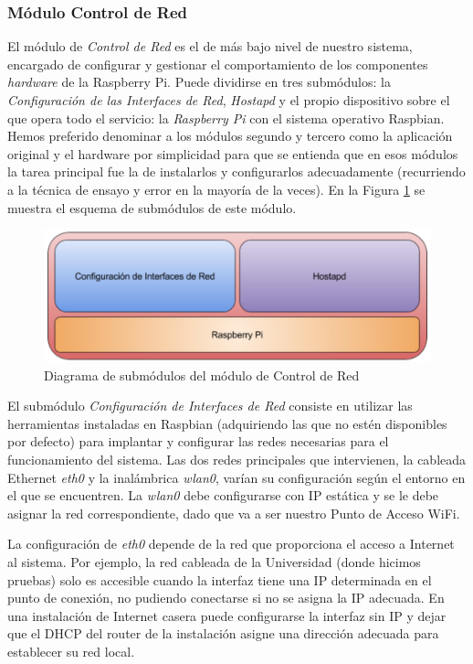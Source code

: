 \subsubsection{Módulo Control de Red}
El módulo de \emph{Control de Red} es el de más bajo nivel de nuestro sistema, encargado de configurar y gestionar el comportamiento de los componentes \emph{hardware} de la Raspberry Pi. Puede dividirse en tres submódulos: la \emph{Configuración de las Interfaces de Red}, \emph{Hostapd} y el propio dispositivo sobre el que opera todo el servicio: la \emph{Raspberry Pi} con el sistema operativo Raspbian. Hemos preferido denominar a los módulos segundo y tercero como la aplicación original y el hardware por simplicidad para que se entienda que en esos módulos la tarea principal fue la de instalarlos y configurarlos adecuadamente (recurriendo a la técnica de ensayo y error en la mayoría de la veces). En la Figura \ref{moduloControlRed} se muestra el esquema de submódulos de este módulo. 

\begin{figure}[!t]
\begin{center}
\includegraphics[width=0.75\linewidth]{./4_AnalisisFuncional/Img/moduloControlRed.png}
\end{center}
\caption{Diagrama de submódulos del módulo de Control de Red}
\label{moduloControlRed}
\end{figure}

El submódulo \emph{Configuración de Interfaces de Red} consiste en utilizar las herramientas instaladas en Raspbian (adquiriendo las que no estén disponibles por defecto) para implantar y configurar las redes necesarias para el funcionamiento del sistema. Las dos redes principales que intervienen, la cableada Ethernet \emph{eth0} y la inalámbrica \emph{wlan0}, varían su configuración según el entorno en el que se encuentren. La \emph{wlan0} debe configurarse con IP estática y se le debe asignar la red correspondiente, dado que va a ser nuestro Punto de Acceso WiFi.

La configuración de \emph{eth0} depende de la red que proporciona el acceso a Internet al sistema. Por ejemplo, la red cableada de la Universidad (donde hicimos pruebas) solo es accesible cuando la interfaz tiene una IP determinada en el punto de conexión, no pudiendo conectarse si no se asigna la IP adecuada. En una instalación de Internet casera puede configurarse la interfaz sin IP y dejar que el DHCP del router de la instalación asigne una dirección adecuada para establecer su red local.

